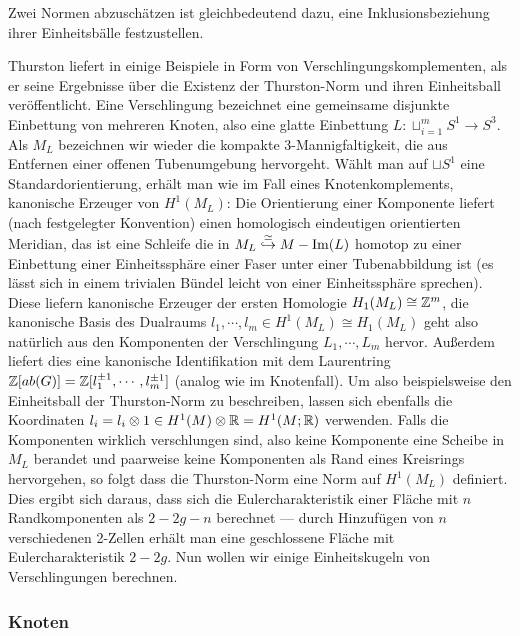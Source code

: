     \begin{bem}
        Zwei Normen abzuschätzen ist gleichbedeutend dazu, eine Inklusionsbeziehung ihrer Einheitsbälle festzustellen. 
    \end{bem}
    \begin{bsp}[Verschlingungen]
    \label{ex:links}
        Thurston liefert in \cite{Thurston.1986} einige Beispiele in Form von Verschlingungskomplementen, als er seine Ergebnisse über die Existenz der Thurston-Norm und ihren Einheitsball veröffentlicht. Eine Verschlingung bezeichnet eine gemeinsame disjunkte Einbettung von mehreren Knoten, also eine glatte Einbettung $L: \sqcup_{i=1}^m S^1 \to S^3$. Als $M_L$ bezeichnen wir wieder die kompakte 3-Mannigfaltigkeit, die aus Entfernen einer offenen Tubenumgebung hervorgeht. Wählt man auf $\sqcup S^1$ eine Standardorientierung, erhält man wie im Fall eines Knotenkomplements, kanonische Erzeuger von $H^1(M_L)$: Die Orientierung einer Komponente liefert (nach festgelegter Konvention) einen homologisch eindeutigen orientierten Meridian, das ist eine Schleife die in $M_L\stackrel \simeq {\hookrightarrow} M - \operatorname{Im}(L)$ homotop zu einer Einbettung einer Einheitssphäre einer Faser unter einer Tubenabbildung ist (es lässt sich in einem trivialen Bündel leicht von einer Einheitssphäre sprechen). Diese liefern kanonische Erzeuger der ersten Homologie $H_1(M_L) \cong \mathbb{Z}^m$, die kanonische Basis des Dualraums $l_1,\cdots,l_m \in H^1(M_L)\cong H_1(M_L)$ geht also natürlich aus den Komponenten der Verschlingung $L_1,\cdots,L_m$ hervor. Außerdem liefert dies eine kanonische Identifikation mit dem Laurentring $\mathbb{Z}[ab(G)]=\mathbb{Z}[l_1^{\pm 1},\cdots,l_m^{\pm 1}]$ (analog wie im Knotenfall). Um also beispielsweise den Einheitsball der Thurston-Norm zu beschreiben, lassen sich ebenfalls die Koordinaten $l_i=l_i \otimes 1 \in H^1(M)\otimes \mathbb{R} = H^1(M;\mathbb{R})$ verwenden. Falls die Komponenten wirklich verschlungen sind, also keine Komponente eine Scheibe in $M_L$ berandet und paarweise keine Komponenten als Rand eines Kreisrings hervorgehen, so folgt dass die Thurston-Norm eine Norm auf $H^1(M_L)$ definiert. Dies ergibt sich daraus, dass sich die Eulercharakteristik einer Fläche mit $n$ Randkomponenten als $2-2g-n$ berechnet --- durch Hinzufügen von $n$ verschiedenen 2-Zellen erhält man eine geschlossene Fläche mit Eulercharakteristik $2-2g$. Nun wollen wir einige Einheitskugeln von Verschlingungen berechnen.
    \end{bsp}
       

        \subsubsection*{Knoten}

